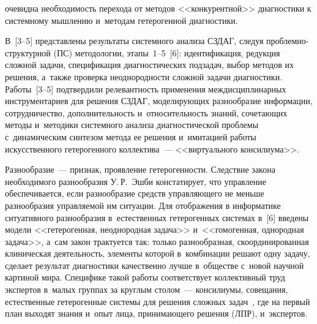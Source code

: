 \begin{multicols}{2}
\pagebreak

\noindent
 очевидна необходимость перехода от методов <<конкурентной>> диагностики 
к системному мышлению и~методам гетерогенной диагностики.
  
  В~[3--5] представлены результаты системного анализа СЗДАГ, следуя 
  проблемно-структурной (ПС) методологии, этапы~1--5~[6]: идентификация, редукция сложной задачи, 
спецификация диагностических подзадач, выбор методов их решения, а~также проверка 
неоднородности сложной задачи диагностики. Работы~[3--5] подтвердили релевантность 
применения междисциплинарных инструментариев для решения 
СЗДАГ, мо\-де\-ли\-ру\-ющих разнообразие информации, 
сотрудничество, дополнительность и~относительность знаний, сочетающих методы 
и~методики системного анализа диагностической проблемы с~динамическим синтезом 
метода ее решения и~имитацией работы искусственного гетерогенного коллектива~--- 
<<виртуального консилиума>>.
  
  Разнообразие~--- признак, проявление гетерогенности. Следствие закона необходимого 
разнообразия У.\,Р.~Эшби констатирует, что управ\-ле\-ние обеспечивается, если разнообразие 
средств управ\-ля\-юще\-го не меньше разнообразия управ\-ля\-емой им ситуации. Для отображения 
в информатике ситуативного разнообразия в~естественных гетерогенных системах в~[6] 
введены модели <<гетерогенная, неоднородная задача>> и~<<гомогенная, однородная 
задача>>, а~сам закон трактуется так: только разнообразная, скоординированная клиническая 
деятельность, элементы которой в~комбинации решают одну задачу, сделает результат 
диагностики качественно лучше в~обществе с~новой научной картиной мира. Специфике 
такой работы соответствует коллективный труд экспертов в~малых группах за круглым 
столом~--- консилиумы, совещания, естественные гетерогенные системы для решения 
сложных задач~\cite{3-kir}, где на первый план выходят знания и~опыт лица, принимающего 
решения (ЛПР), и~экспертов.
  
  \begin{figure*} %
\vspace*{1pt}
 \begin{center}  
\mbox{%
 \epsfxsize=147.497mm
 }
\end{center} 
  \end{figure*}


\end{multicols}
